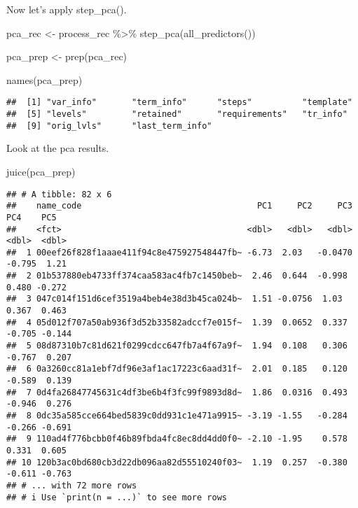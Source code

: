 \documentclass[
]{article}
\newenvironment{Shaded}{\begin{snugshade}}{\end{snugshade}}
\newcommand{\FunctionTok}[1]{\textcolor[rgb]{0.00,0.00,0.00}{#1}}
\newcommand{\NormalTok}[1]{#1}
\newcommand{\OtherTok}[1]{\textcolor[rgb]{0.56,0.35,0.01}{#1}}
\newcommand{\SpecialCharTok}[1]{\textcolor[rgb]{0.00,0.00,0.00}{#1}}
\begin{document}
Now let's apply step\_pca().

\begin{Shaded}
\begin{Highlighting}[]
\NormalTok{pca\_rec }\OtherTok{\textless{}{-}}
\NormalTok{  process\_rec }\SpecialCharTok{\%\textgreater{}\%} 
  \FunctionTok{step\_pca}\NormalTok{(}\FunctionTok{all\_predictors}\NormalTok{())}

\NormalTok{pca\_prep }\OtherTok{\textless{}{-}} \FunctionTok{prep}\NormalTok{(pca\_rec)}
\end{Highlighting}
\end{Shaded}

\begin{Shaded}
\begin{Highlighting}[]
\FunctionTok{names}\NormalTok{(pca\_prep)}
\end{Highlighting}
\end{Shaded}

\begin{verbatim}
##  [1] "var_info"       "term_info"      "steps"          "template"      
##  [5] "levels"         "retained"       "requirements"   "tr_info"       
##  [9] "orig_lvls"      "last_term_info"
\end{verbatim}

Look at the pca results.

\begin{Shaded}
\begin{Highlighting}[]
\FunctionTok{juice}\NormalTok{(pca\_prep)}
\end{Highlighting}
\end{Shaded}

\begin{verbatim}
## # A tibble: 82 x 6
##    name_code                                   PC1     PC2     PC3    PC4    PC5
##    <fct>                                     <dbl>   <dbl>   <dbl>  <dbl>  <dbl>
##  1 00eef26f828f1aaae411f94c8e475927548447fb~ -6.73  2.03   -0.0470 -0.795  1.21 
##  2 01b537880eb4733ff374caa583ac4fb7c1450beb~  2.46  0.644  -0.998   0.480 -0.272
##  3 047c014f151d6cef3519a4beb4e38d3b45ca024b~  1.51 -0.0756  1.03    0.367  0.463
##  4 05d012f707a50ab936f3d52b33582adccf7e015f~  1.39  0.0652  0.337  -0.705 -0.144
##  5 08d87310b7c81d621f0299cdcc647fb7a4f67a9f~  1.94  0.108   0.306  -0.767  0.207
##  6 0a3260cc81a1ebf7df96e3af1ac17223c6aad31f~  2.01  0.185   0.120  -0.589  0.139
##  7 0d4fa26847745631c4df3be6b4f3fc99f9893d8d~  1.86  0.0316  0.493  -0.946  0.276
##  8 0dc35a585cce664bed5839c0dd931c1e471a9915~ -3.19 -1.55   -0.284  -0.266 -0.691
##  9 110ad4f776bcbb0f46b89fbda4fc8ec8dd4dd0f0~ -2.10 -1.95    0.578   0.331  0.605
## 10 120b3ac0bd680cb3d22db096aa82d55510240f03~  1.19  0.257  -0.380  -0.611 -0.763
## # ... with 72 more rows
## # i Use `print(n = ...)` to see more rows
\end{verbatim}
\end{document}
